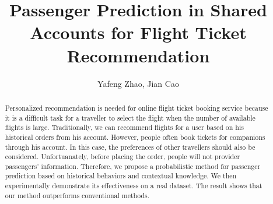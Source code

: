 \documentclass{llncs}
\begin{document}
\title{Passenger Prediction in Shared Accounts for Flight Ticket Recommendation}

%


\author{Yafeng Zhao, Jian Cao}


\maketitle
\begin{abstract}
Personalized recommendation is needed for online flight ticket booking service because it is a difficult task for a traveller to select the flight when the number of available flights is large. Traditionally, we can recommend flights for a user based on his historical orders from his account. However, people often book tickets for companions through his account. In this case, the preferences of other travellers should also be considered. Unfortuanately, before placing the order, people will not provider passengers' information. Therefore, we propose a probabilistic method for passenger prediction based on historical behaviors and contextual knowledge. We then experimentally demonstrate its effectiveness on a real dataset. The result shows that our method outperforms conventional methods.\\
\end{abstract}
\end{document}
